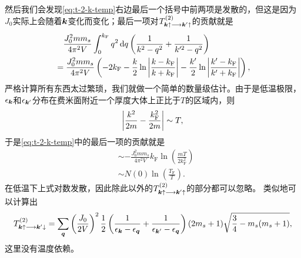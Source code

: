 然后我们会发现\eqref{eq:t-2-k-temp}右边最后一个括号中前两项是发散的，但这是因为$J_0$实际上会随着$\vb*{k}$变化而变化；最后一项对$T^{(2)}_{\vb*{k} \uparrow \longrightarrow \vb*{k}' \uparrow}$的贡献就是
\[
    \begin{aligned}
        &\quad \frac{J_0^2 m m_s}{4\pi^2 V} \int_0^{k_\text{F}} q^2 \dd{q} \left( \frac{1}{k^2 - q^2} + \frac{1}{k'^2 - q^2} \right) \\
        &= \frac{J_0^2 m m_s}{4\pi^2 V} \left( - 2 k_\text{F} - \frac{k}{2} \ln \abs{\frac{k-k_\text{F}}{k+k_\text{F}}} - \frac{k'}{2} \ln \abs{\frac{k'-k_\text{F}}{k'+k_\text{F}}} \right),
    \end{aligned}
\]
严格计算所有东西太过繁琐，我们就做一个简单的数量级估计。由于是低温极限，$\epsilon_{\vb*{k}}$和$\epsilon_{\vb*{k}'}$分布在费米面附近一个厚度大体上正比于$T$的区域内，则
\[
    \abs{\frac{k^2}{2m} - \frac{k_\text{F}^2}{2m}} \sim T,
\]
于是\eqref{eq:t-2-k-temp}中的最后一项的贡献就是
\[
    \begin{aligned}
        & \sim - \frac{J_0^2 m m_s}{4\pi^2 V} k_\text{F} \ln \left( \frac{m T}{2 k_\text{F}^2} \right) \\
        & \sim N(0) \ln(\frac{T_\text{F}}{T}).
    \end{aligned}
\]
在低温下上式对数发散，因此除此以外的$T^{(2)}_{\vb*{k} \uparrow \longrightarrow \vb*{k}' \uparrow}$的部分都可以忽略。
类似地可以计算出
\begin{equation}
    T^{(2)}_{\vb*{k} \uparrow \longrightarrow \vb*{k}' \downarrow} = \sum_{\vb*{q}} \left( \frac{J_0}{2V} \right)^2 \frac{1}{2} \left( \frac{1}{\epsilon_{\vb*{k}} - \epsilon_{\vb*{q}}} + \frac{1}{\epsilon_{\vb*{k}'} - \epsilon_{\vb*{q}}} \right) (2 m_s + 1) \sqrt{\frac{3}{4} - m_s (m_s + 1)},
\end{equation}
这里没有温度依赖。

